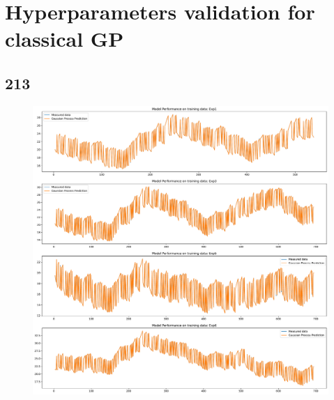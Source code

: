 \clearpage

\section{Hyperparameters validation for classical GP}

\subsection{213}

\begin{figure}[ht]
    \centering
    \includegraphics[width = \textwidth]{Plots/GP_213_training_performance.pdf}
    \caption{}
    \label{fig:GP_213_train_validation}
\end{figure}

